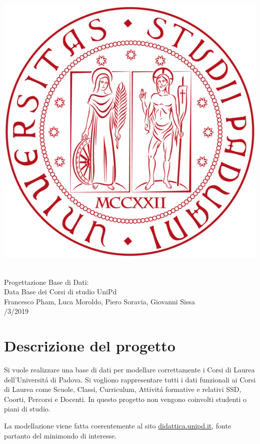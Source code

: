 \documentclass[a4paper,12pt,italian,towside]{article}
\begin{document}
\begin{titlepage}
	\centering
	\includegraphics[scale= 0.2]{unipd.png} \centering 
	{\huge \\ \medskip Progettazione Base di Dati: \\ Data Base dei Corsi di studio UniPd\\ \medskip \medskip  \medskip \normalsize Francesco Pham, Luca Moroldo, Piero Soravia, Giovanni Sissa \\ /3/2019\par }
	

\end{titlepage}



\newpage

\tableofcontents

\newpage
\section{Descrizione del progetto}
Si vuole realizzare una base di dati per modellare correttamente i Corsi di Laurea dell'Universit\'a di Padova.
Si vogliono rappresentare tutti i dati funzionali ai Corsi di Laurea come Scuole, Classi, Curriculum, Attivit\'a formative e relativi SSD, Coorti, Percorsi e Docenti.
In questo progetto non vengono coinvolti studenti o piani di studio.
\par
La modellazione viene fatta coerentemente al sito  \href{https://didattica.unipd.it/}{didattica.unipd.it}, fonte partanto del minimondo di interesse.
\end{document}
